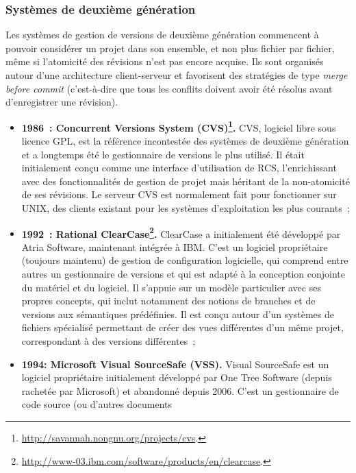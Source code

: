 \subsubsection{Systèmes de deuxième génération}

Les systèmes de gestion de versions de deuxième génération commencent
à pouvoir considérer un projet dans son ensemble, et non plus fichier
par fichier, même si l'atomicité des révisions n'est pas encore
acquise. Ils sont organisés autour d'une architecture client-serveur
et favorisent des stratégies de type \textit{merge before commit}
(c'est-à-dire que tous les conflits doivent avoir été résolus avant
d'enregistrer une révision).

\begin{itemize}
\item \textbf{1986~: Concurrent Versions System
    (CVS)\footnote{\url{http://savannah.nongnu.org/projects/cvs}.}.}
  CVS, logiciel libre sous licence GPL, est la référence incontestée
  des systèmes de deuxième génération et a longtemps été le
  gestionnaire de versions le plus utilisé. Il était initialement
  conçu comme une interface d'utilisation de RCS, l'enrichissant avec
  des fonctionnalités de gestion de projet mais héritant de la
  non-atomicité de ses révisions. Le serveur CVS est normalement fait
  pour fonctionner sur UNIX, des clients existant pour les
  systèmes d'exploitation les plus courants~;
\item \textbf{1992~: Rational
    ClearCase\footnote{\url{http://www-03.ibm.com/software/products/en/clearcase}.}.} ClearCase a initialement été développé par Atria
  Software, maintenant intégrée à IBM. C'est un logiciel propriétaire
  (toujours maintenu) de gestion de configuration logicielle, qui
  comprend entre autres un gestionnaire de versions et qui est adapté
  à la conception conjointe du matériel et du logiciel. Il s'appuie
  sur un modèle particulier avec ses propres concepts, qui inclut
  notamment des notions de branches et de versions aux sémantiques
  prédéfinies. Il est conçu autour d'un systèmes de fichiers
  spécialisé permettant de créer des vues différentes d'un même
  projet, correspondant à des versions différentes~;
\item \textbf{1994: Microsoft Visual SourceSafe
    (VSS).} Visual SourceSafe est
  un logiciel propriétaire initialement développé par One Tree
  Software (depuis rachetée par Microsoft) et abandonné depuis
  2006. C'est un gestionnaire de code source (ou d'autres documents

\end{itemize}
